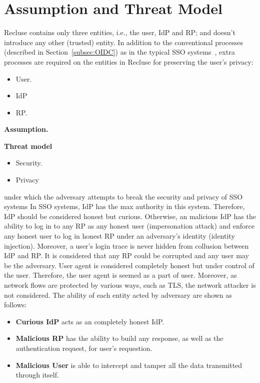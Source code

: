 \section{Assumption and Threat Model}
\label{sec:assumptionandthreatmodel}
Recluse contains only three entities, i.e., the user, IdP and RP; and doesn't introduce any other (trusted) entity. In addition to the conventional processes (described in Section~\ref{subsec:OIDC}) as in the typical SSO systems~\cite{SAMLIdentifier,OpenIDConnect}, extra processes are required on the entities in Recluse for preserving the user's privacy:
\begin{itemize}
  \item User.
  \item IdP
  \item RP. 
\end{itemize}

\noindent\textbf{Assumption.}

\noindent\textbf{Threat model}
\begin{itemize}
  \item Security.
  \item Privacy
\end{itemize}

under which the adversary attempts to break the security and privacy of SSO systems
In SSO systems, IdP has the max authority in this system. Therefore, IdP should be considered honest but curious. Otherwise, an malicious IdP has the ability to log in to any RP as any honest user (impersonation attack) and enforce any honest user to log in honest RP under an adversary's identity (identity injection). Moreover, a user's login trace is never hidden from collusion between IdP and RP. It is considered that any RP could be corrupted and any user may be the adversary. User agent is considered completely honest but under control of the user. Therefore, the user agent is seemed as a part of user. Moreover, as network flows are protected by various ways, such as TLS, the network attacker is not considered. The ability of each entity acted by adversary are shown as follows:
\begin{itemize}
\item \textbf{Curious IdP} acts as an completely honest IdP.
\item \textbf{Malicious RP} has the ability to build any response, as well as the authentication request, for user's requestion.
\item \textbf{Malicious User} is able to intercept and tamper all the data transmitted through itself.
\end{itemize}

